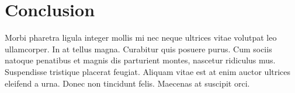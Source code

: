 \chapter{Conclusion}
Morbi pharetra ligula integer mollis mi nec neque ultrices vitae volutpat leo ullamcorper. In at tellus magna. Curabitur quis posuere purus. Cum sociis natoque penatibus et magnis dis parturient montes, nascetur ridiculus mus. Suspendisse tristique placerat feugiat. Aliquam vitae est at enim auctor ultrices eleifend a urna. Donec non tincidunt felis. Maecenas at suscipit orci.
